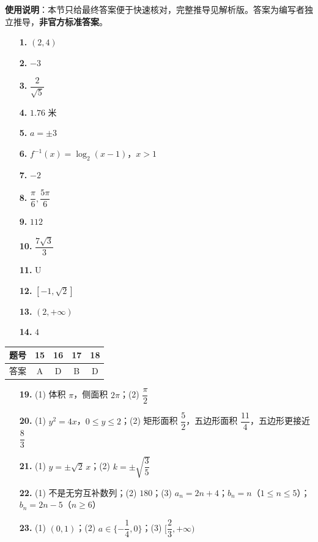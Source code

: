 
\begin{gknotice}
\textbf{使用说明}：本节只给最终答案便于快速核对，完整推导见解析版。答案为编写者独立推导，\textbf{非官方标准答案}。
\end{gknotice}

\begin{itemize}[leftmargin=2.6em]
  \item[\textbf{1.}] \( (2,4) \)
  \item[\textbf{2.}] \(-3\)
  \item[\textbf{3.}] \(\dfrac{2}{\sqrt5}\)
  \item[\textbf{4.}] \(1.76\) 米
  \item[\textbf{5.}] \(a=\pm3\)
  \item[\textbf{6.}] \(f^{-1}(x)=\log_2(x-1)\)，\(x>1\)
  \item[\textbf{7.}] \(-2\)
  \item[\textbf{8.}] \(\dfrac{\pi}{6},\dfrac{5\pi}{6}\)
  \item[\textbf{9.}] \(112\)
  \item[\textbf{10.}] \(\dfrac{7\sqrt3}{3}\)
  \item[\textbf{11.}] U
  \item[\textbf{12.}] \([-1,\sqrt2]\)
  \item[\textbf{13.}] \((2,+\infty)\)
  \item[\textbf{14.}] \(4\)
\end{itemize}

\begin{center}\begin{tabular}{ccccc}
\toprule
题号 & 15 & 16 & 17 & 18 \\
\midrule
答案 & A & D & B & D \\
\bottomrule
\end{tabular}\end{center}

\begin{itemize}[leftmargin=2.6em]
  \item[\textbf{19.}] (1) 体积 \(\pi\)，侧面积 \(2\pi\)；(2) \(\dfrac{\pi}{2}\)
  \item[\textbf{20.}] (1) \(y^2=4x\)，\(0\le y\le2\)；(2) 矩形面积 \(\dfrac52\)，五边形面积 \(\dfrac{11}{4}\)，五边形更接近 \(\dfrac83\)
  \item[\textbf{21.}] (1) \(y=\pm\sqrt2\,x\)；(2) \(k=\pm\sqrt{\dfrac35}\)
  \item[\textbf{22.}] (1) 不是无穷互补数列；(2) \(180\)；(3) \(a_n=2n+4\)；\(b_n=n\)（\(1\le n\le5\)）；\(b_n=2n-5\)（\(n\ge6\)）
  \item[\textbf{23.}] (1) \((0,1)\)；(2) \(a\in\{-\dfrac14,0\}\)；(3) \([\dfrac23,+\infty)\)
\end{itemize}
